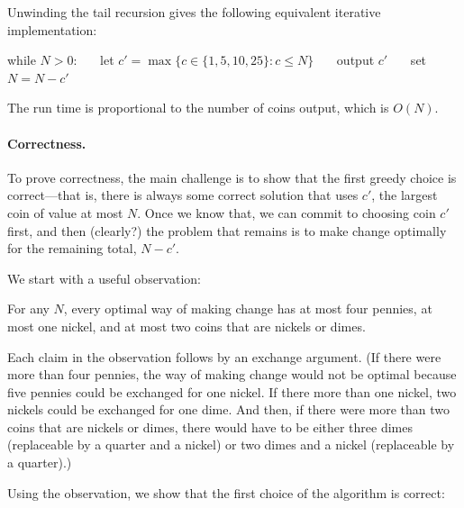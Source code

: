 Unwinding the tail recursion gives the following equivalent iterative implementation:
\begin{myframed}
  \begin{steps}
  \item[{\textsf{ichangeUS}$(N)$:}]
    \step while $N > 0$: 
    \step~~~let $c' = \max\big\{c \in \{1, 5, 10, 25\} : c \le N\big\}$
    \step~~~output $c'$
    \step~~~set $N = N-c'$
  \end{steps}
\end{myframed}

The run time is proportional to the number of coins output, which is $O(N)$.  

\paragraph{Correctness.}

To prove correctness, the main challenge is to show that the first greedy choice is correct---that is, there is always some correct solution that uses $c'$, the largest coin of value at most $N$.
Once we know that, we can commit to choosing coin $c'$ first,
and then (clearly?) the problem that remains is to make change optimally for the remaining total, $N-c'$.

We start with a useful observation:
\begin{observation}\label{greedy: obs: change}  For any $N$, every optimal way of making change has
  at most four pennies, at most one nickel,
  and at most two coins that are nickels or dimes.
\end{observation}
Each claim in the observation follows by an exchange argument.
(If there were more than four pennies,
the way of making change would not be optimal because five pennies could be exchanged for one nickel.
If there more than one nickel, two nickels could be exchanged for one dime.
And then, if there were more than two coins that are nickels or dimes,
there would have to be either three dimes (replaceable by a quarter and a nickel)
or two dimes and a nickel (replaceable by a quarter).)

Using the observation, we show that the first choice of the algorithm is correct:

